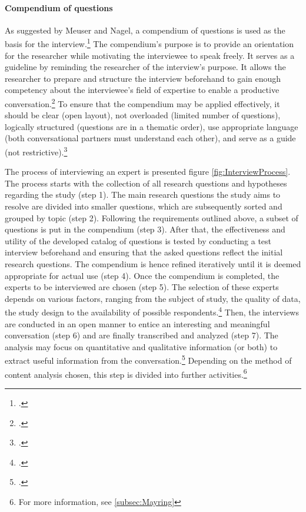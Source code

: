 \paragraph{Compendium of questions} As suggested by Meuser and Nagel, a compendium of questions is used as the basis for the interview.\footcite[Cf.][p.472]{MeuserExperteninterviewkonzeptionelleGrundlagen2009} The compendium's purpose is to provide an orientation for the researcher while motivating the interviewee to speak freely. It serves as a guideline by reminding the researcher of the interview's purpose. It allows the researcher to prepare and structure the interview beforehand to gain enough competency about the interviewee's field of expertise to enable a productive conversation.\footcites[Cf.][p.472 et seqq]{MeuserExperteninterviewkonzeptionelleGrundlagen2009}[cf.][p.133]{KrugerMethodennaturwissenschaftsdidaktischenForschung2014}[cf.][p.431 et seq]{BognerInterviewsmitExperten2014}[cf.][p.123 et seqq]{NiebertLeitfadengestutzteInterviews2014}[cf.][p.421]{AghamanoukjanQualitativeInterviews2007}
To ensure that the compendium may be applied effectively, it should be clear (open layout), not overloaded (limited number of questions), logically structured (questions are in a thematic order), use appropriate language (both conversational partners must understand each other), and serve as a guide (not restrictive).\footcite[Cf.][p.126]{NiebertLeitfadengestutzteInterviews2014}

The process of interviewing an expert is presented figure \ref{fig:InterviewProcess}. The process starts with the collection of all research questions and hypotheses regarding the study (step 1). The main research questions the study aims to resolve are divided into smaller questions, which are subsequently sorted and grouped by topic (step 2). Following the requirements outlined above, a subset of questions is put in the compendium (step 3). After that, the effectiveness and utility of the developed catalog of questions is tested by conducting a test interview beforehand and ensuring that the asked questions reflect the initial research questions. The compendium is hence refined iteratively until it is deemed appropriate for actual use (step 4). Once the compendium is completed, the experts to be interviewed are chosen (step 5). The selection of these experts depends on various factors, ranging from the subject of study, the quality of data, the study design to the availability of possible respondents.\footcites[Cf.][p.134]{KrugerqualitativeInhaltsanalyseMethode2004}[cf.][p.1 et seq.]{MorseDeterminingsamplesize2000}[cf.][p.137]{Flickintroductionqualitativeresearch2009} Then, the interviews are conducted in an open manner to entice an interesting and meaningful conversation (step 6) and are finally transcribed and analyzed (step 7). The analysis may focus on quantitative and qualitative information (or both) to extract useful information from the conversation.\footcites[Cf.][p.37 et seqq]{BognerInterviewsmitExperten2014}[cf.][p.454 et seqq]{MeuserExperteninterviewkonzeptionelleGrundlagen2009}[cf.][p.72]{MasonQualitativeresearching2002} Depending on the method of content analysis chosen, this step is divided into further activities.\footnote{For more information, see \ref{subsec:Mayring}}


